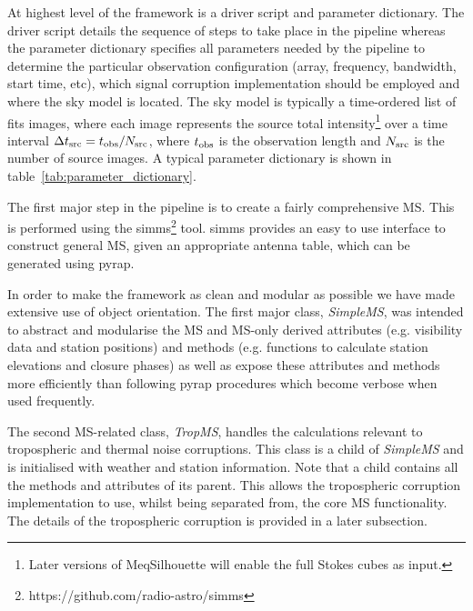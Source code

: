 At highest level of the framework is a driver script and parameter dictionary. The driver script details the sequence of steps to take place in the pipeline whereas the parameter dictionary specifies all parameters needed by the pipeline to determine the particular observation configuration (array, frequency, bandwidth, start time, etc), which signal corruption implementation should be employed and where the sky model is located. The sky model is typically a time-ordered list of {\sc fits} images, where each image represents the source total intensity\footnote{Later versions of {\sc MeqSilhouette} will enable the full Stokes cubes as input.} over a time interval $\Delta t_{\rm src} = t_{\rm obs}/N_{\rm src}$, where $t_{\rm obs}$ is the observation length and $N_{\rm src}$ is the number of source images. A typical parameter dictionary is shown in table~\ref{tab:parameter_dictionary}.



The first major step in the pipeline is to create a fairly comprehensive MS. This is performed using the {\sc simms}\footnote{https://github.com/radio-astro/simms} tool. {\sc simms} provides an easy to use interface to construct general MS, given an appropriate antenna table, which can be generated using {\sc pyrap}. 

In order to make the framework as clean and  modular as possible we have made extensive use of object orientation. The first major class, \emph{SimpleMS}, was intended to abstract and modularise the MS and MS-only derived attributes (e.g. visibility data and station positions) and methods (e.g. functions to calculate station elevations and closure phases) as well as expose these attributes and methods more efficiently than following {\sc pyrap} procedures which become verbose when used frequently.

The second MS-related class, \emph{TropMS}, handles the calculations relevant to tropospheric and thermal noise corruptions. This class is a child of {\it SimpleMS} and is initialised with weather and station information. Note that a child contains all the methods and attributes of its parent. This allows the tropospheric corruption implementation to use, whilst being separated from, the core MS functionality. The details of the tropospheric corruption is provided in a later subsection.

